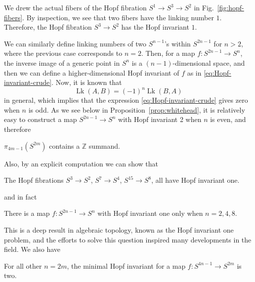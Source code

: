 \documentclass[12pt]{article}
\numberwithin{equation}{section}
\numberwithin{figure}{section}
\theoremstyle{remark}
\def\bZ{\mathbb{Z}}
\def\Lk{\mathop{\mathrm{Lk}}}
\begin{document}
We drew the actual fibers of the Hopf fibration $S^1\to S^3\to S^2$ in Fig.~\ref{fig:hopf-fibers}.
By inspection, we see that two fibers have the linking number $1$. 
Therefore, the Hopf fibration $S^3\to S^2$ has the Hopf invariant $1$.

We can similarly define linking numbers of two $S^{n-1}$'s within $S^{2n-1}$ for $n>2$,
where the previous case corresponds to $n=2$.
Then, for a map $f: S^{2n-1}\to S^{n}$,
the inverse image of a generic point in $S^n$ is a $(n-1)$-dimensional space,
and then we can define a higher-dimensional Hopf invariant of $f$ as in \eqref{eq:Hopf-invariant-crude}.
Now, it is known that  \begin{equation}
\Lk (A,B)=(-1)^n \Lk (B,A)
\label{eq:Lk-sym}
\end{equation} in general, which implies that the expression \eqref{eq:Hopf-invariant-crude} gives zero when $n$ is odd.
As we see below in Proposition~\ref{prop:whitehead}, 
it is relatively easy to construct a map $S^{2n-1}\to S^n$ with Hopf invariant 2 when  $n$ is even, and therefore
\begin{theorem}
  $\pi_{4m-1}(S^{2m})$ contains a  $\bZ$ summand.
\end{theorem}

Also, by an explicit computation we can show  that \begin{proposition}
The Hopf fibrations $S^3\to S^2$, $S^7\to S^4$, $S^{15}\to S^8$,
all have Hopf invariant one.
\end{proposition}
and in fact 
\begin{theorem}
There is a map $f:S^{2n-1}\to S^n$ with Hopf invariant one
only when $n=2,4,8$.
\end{theorem}
This is a deep result in algebraic topology, known as the Hopf invariant one problem,
and the efforts to solve this question inspired many developments in the field.
We also have
\begin{proposition}
\label{prop:whitehead}
For all other $n=2m$, the minimal Hopf invariant for a map $f:S^{4n-1}\to S^{2m}$ is two.
\end{proposition}
\end{document}
